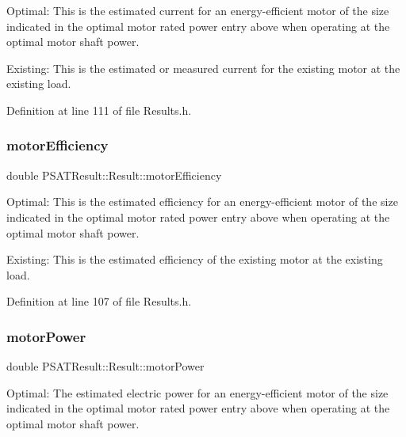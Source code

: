Optimal\+: This is the estimated current for an energy-\/efficient motor of the size indicated in the optimal motor rated power entry above when operating at the optimal motor shaft power. 

Existing\+: This is the estimated or measured current for the existing motor at the existing load. 

Definition at line 111 of file Results.\+h.

\mbox{\label{struct_p_s_a_t_result_1_1_result_ad995bfd4c4d8372c99721d3fb43f1919}} 
\subsubsection{\texorpdfstring{motor\+Efficiency}{motorEfficiency}}
{\footnotesize\ttfamily double P\+S\+A\+T\+Result\+::\+Result\+::motor\+Efficiency}



Optimal\+: This is the estimated efficiency for an energy-\/efficient motor of the size indicated in the optimal motor rated power entry above when operating at the optimal motor shaft power. 

Existing\+: This is the estimated efficiency of the existing motor at the existing load. 

Definition at line 107 of file Results.\+h.

\mbox{\label{struct_p_s_a_t_result_1_1_result_ad51cbcc62a9515f5ffe119acbb4a4232}} 
\subsubsection{\texorpdfstring{motor\+Power}{motorPower}}
{\footnotesize\ttfamily double P\+S\+A\+T\+Result\+::\+Result\+::motor\+Power}



Optimal\+: The estimated electric power for an energy-\/efficient motor of the size indicated in the optimal motor rated power entry above when operating at the optimal motor shaft power. 

